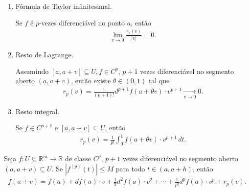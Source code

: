 \begin{note}[Resto]
  \phantom{x}
  \begin{enumerate}
    \item Fórmula de Taylor infinitesimal.

      Se $f$ é $p$-vezes diferenciável no ponto $a$, então
      \begin{align*}
        \lim_{v\to 0}\frac{r_p(v)}{|v|}=0.
      \end{align*}
    \item Resto de Lagrange.

      Assumindo $[a,a+v]\subseteq U,f\in C^{p}$, $p+1$ vezes diferenciável no segmento aberto $(a,a+v)$, então existe $\theta\in(0,1)$ tal que 
      \begin{align*}
        r_p(v)=\frac{1}{(p+1)!}d^{p+1}f(a+\theta v)\cdot v^{p+1}\xrightarrow[v\to 0]{}0.
      \end{align*}
    \item Resto integral.

      Se $f\in C^{p+1}$ e $[a,a+v]\subseteq U$, então
      \begin{align*}
        r_p(v)=\frac{1}{p!}\int_{0}^{1}f(a+\theta v)\cdot v^{p+1}\,dt.
      \end{align*}
  \end{enumerate}
\end{note}
\begin{theorem}
  Seja $f:U\subseteq\mathbb{R}^{m}\to\mathbb{R}$ de classe $C^{p}$, $p+1$ vezes diferenciável no segmento aberto $(a,a+v)\subseteq U$. Se $|f^{(p)}(t)|\leq M$ para todo $t\in (a,a+h)$, então
  \begin{align*}
    f(a+v)=f(a)+df(a)\cdot v+\frac{1}{2}d^{2}f(a)\cdot v^{2}+\cdots+\frac{1}{p!}d^{p}f(a)\cdot v^{p}+r_p(v).
  \end{align*}
\end{theorem}
